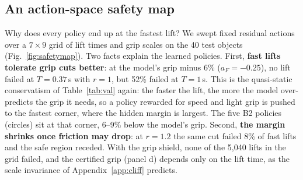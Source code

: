 \subsection{An action-space safety map}\label{sec:map}
Why does every policy end up at the fastest lift? We swept fixed residual actions over a $7\times9$ grid of lift times and
grip scales on the 40 test objects (Fig.~\ref{fig:safetymap}). Two facts explain the learned policies. First, \textbf{fast lifts
tolerate grip cuts better}: at the model's grip minus 6\% ($a_F=-0.25$), no lift failed at $T=0.37$\,s with $r=1$, but 52\%
failed at $T=1$\,s. This is the quasi-static conservatism of Table~\ref{tab:val} again: the faster the lift, the more the
model over-predicts the grip it needs, so a policy rewarded for speed and light grip is pushed to the fastest corner, where
the hidden margin is largest. The five B2 policies (circles) sit at that corner, 6--9\% below the model's grip. Second,
\textbf{the margin shrinks once friction may drop}: at $r=1.2$ the same cut failed 8\% of fast lifts and the safe region
receded. With the grip shield, none of the 5{,}040 lifts in the grid failed, and the certified grip (panel d) depends only
on the lift time, as the scale invariance of Appendix~\ref{app:cliff} predicts.


